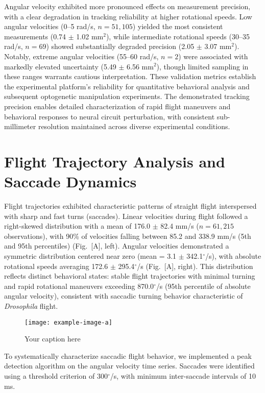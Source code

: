\documentclass[../main/thesis_msc.tex]{subfiles}
\begin{document}
Angular velocity exhibited more pronounced effects on measurement precision, with a clear degradation in tracking reliability at higher rotational speeds. Low angular velocities (0--5 rad/s, $n = 51,105$) yielded the most consistent measurements (0.74 $\pm$ 1.02 mm$^2$), while intermediate rotational speeds (30--35 rad/s, $n = 69$) showed substantially degraded precision (2.05 $\pm$ 3.07 mm$^2$). Notably, extreme angular velocities (55--60 rad/s, $n = 2$) were associated with markedly elevated uncertainty (5.49 $\pm$ 6.56 mm$^2$), though limited sampling in these ranges warrants cautious interpretation.
These validation metrics establish the experimental platform's reliability for quantitative behavioral analysis and subsequent optogenetic manipulation experiments. The demonstrated tracking precision enables detailed characterization of rapid flight maneuvers and behavioral responses to neural circuit perturbation, with consistent sub-millimeter resolution maintained across diverse experimental conditions.

\section{Flight Trajectory Analysis and Saccade Dynamics}

Flight trajectories exhibited characteristic patterns of straight flight interspersed with sharp and fast turns (saccades). Linear velocities during flight followed a right-skewed distribution with a mean of 176.0 $\pm$ 82.4 mm/s ($n = 61,215$ observations), with 90\% of velocities falling between 85.2 and 338.9 mm/s (5th and 95th percentiles) (Fig.~[A], left). Angular velocities demonstrated a symmetric distribution centered near zero (mean = 3.1 $\pm$ 342.1$^{\circ}$/s), with absolute rotational speeds averaging 172.6 $\pm$ 295.4$^{\circ}$/s (Fig.~[A], right). This distribution reflects distinct behavioral states: stable flight trajectories with minimal turning and rapid rotational maneuvers exceeding 870.0$^{\circ}$/s (95th percentile of absolute angular velocity), consistent with saccadic turning behavior characteristic of \textit{Drosophila} flight.

\begin{figure}[htbp]
    \centering
    \texttt{[image: example-image-a]}
    \caption{Your caption here}
    \label{fig:your-label}
\end{figure}

To systematically characterize saccadic flight behavior, we implemented a peak detection algorithm on the angular velocity time series. Saccades were identified using a threshold criterion of 300$^{\circ}$/s, with minimum inter-saccade intervals of 10 ms.
\end{document}

